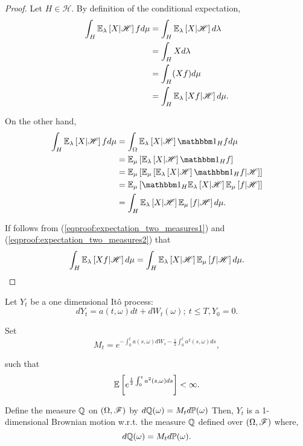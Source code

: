 \documentclass[../TGMAFFIRO.tex]{subfiles}
\begin{document}
\begin{proof}
	Let $H\in\mathscr{H}$. By definition of the conditional expectation,
	\begin{align}
		\int_H \mathbb{E}_{\lambda}\left[X|\mathscr H\right] fd\mu &= \int_H \mathbb{E}_{\lambda}\left[X|\mathscr H\right] d\lambda\nonumber\\
		&= \int_H X d\lambda\nonumber \\
		&= \int_H (Xf)d\mu\nonumber \\
		&= \int_H \mathbb{E}_{\lambda}\left[Xf|\mathscr H\right] d\mu. \label{eqproof:expectation_two_measures1}
	\end{align}
	
On the other hand,
\begin{align}
	\int_H \ExpMeasure{\lambda}{X|\salgH} fd\mu &= \int_\Omega \ExpMeasure{\lambda}{X|\salgH}\ind_H f d\mu\nonumber\\
	&= \ExpMeasure{\mu}{\ExpMeasure{\lambda}{X|\salgH}\ind_H f}\nonumber\\
	&= \ExpMeasure{\mu}{\ExpMeasure{\mu}{\ExpMeasure{\lambda}{X|\salgH}\ind_H f | \salgH}}\nonumber\\
	&= \ExpMeasure{\mu}{\ind_H\ExpMeasure{\lambda}{X|\salgH} \ExpMeasure{\mu}{f | \salgH}}\nonumber\\
	&= \int_H \ExpMeasure{\lambda}{X|\salgH} \ExpMeasure{\mu}{f | \salgH} d\mu.\label{eqproof:expectation_two_measures2}
\end{align}

If follows from (\ref{eqproof:expectation_two_measures1}) and (\ref{eqproof:expectation_two_measures2}) that
\begin{equation}
  \int_H \mathbb{E}_{\lambda}\left[Xf|\mathscr H\right] d\mu = \int_H \mathbb{E}_{\lambda}\left[X|\mathscr{H}\right] \mathbb{E}_{\mu}\left[f | \mathscr{H}\right] d\mu.
\end{equation}
\end{proof}
\begin{theorem}
	Let $Y_t$ be a one dimensional It\^o process:
	\[
		dY_t = a(t, \omega) dt + dW_t(\omega); \ t \leq T, Y_0 = 0.
	\]

Set 
\[
	M_t = e^{-\int_0^t a(s,\omega) dW_s - \frac{1}{2}\int_0^t a^2(s,\omega) ds},
\]

such that
\[
	\mathbb{E}\left[e^{\frac{1}{2}\int_0^t a^2(s,\omega) ds}\right] < \infty.
\]

Define the measure $\mathbb{Q}$ on $(\Omega,\mathscr{F})$ by $d\mathbb{Q}(\omega) = M_t d\mathbb{P}(\omega)$
Then, $Y_t$ is a 1-dimensional Brownian motion w.r.t. the measure $\mathbb{Q}$ defined over $(\Omega,\mathscr{F})$ where,
\[
	d\mathbb{Q}(\omega) = M_t d\mathbb{P}(\omega).
\]
\end{theorem}
\end{document}
